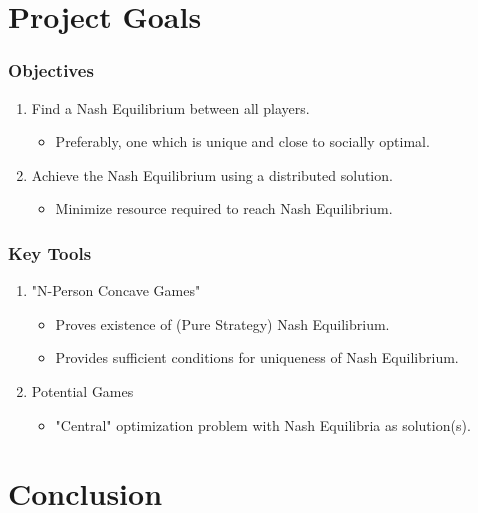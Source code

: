 \documentclass[10pt,tgadventor, onlymath]{beamer}
\begin{document}
\section{Project Goals}

\begin{frame}
\frametitle{Objectives}
\begin{enumerate}
\item Find a Nash Equilibrium between all players.
\begin{itemize}
\item Preferably, one which is unique and close to socially optimal.
\end{itemize}
\item Achieve the Nash Equilibrium using a distributed solution.
\begin{itemize}
\item Minimize resource required to reach Nash Equilibrium.
\end{itemize}
\end{enumerate}

\begin{center}
\end{center}
\end{frame}

\begin{frame}
\frametitle{Key Tools}
\begin{enumerate}
\item "N-Person Concave Games"
\begin{itemize}
\item Proves existence of (Pure Strategy) Nash Equilibrium.
\item Provides sufficient conditions for uniqueness of Nash Equilibrium.
\end{itemize}
\item 
Potential Games
\begin{itemize}
\item "Central" optimization problem with Nash Equilibria as solution(s).
\end{itemize}
\end{enumerate}
\end{frame}
%
\section{Conclusion}

\begin{frame}


\end{frame}
\end{document}
